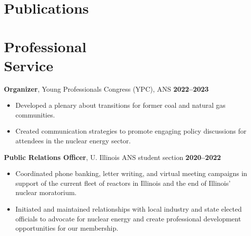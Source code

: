 \documentclass[margin,line]{resume}
\begin{document}
\begin{resume}
    \section{\mysidestyle Publications}

    \begin{bibenum}
        \item {}
        \item {}
        \item {}
        \item {}
    \end{bibenum}

    \section{\mysidestyle Professional\\Service}

    \textbf{Organizer}, Young Professionals Congress (YPC), ANS \hfill \textbf{2022--2023}\vspace{.5mm}\\%
    \begin{itemize}
        \item Developed a plenary about transitions for former coal and natural gas communities.
        \item Created communication strategies to promote engaging policy discussions for attendees in the nuclear energy sector.
    \end{itemize}

    \textbf{Public Relations Officer}, U. Illinois ANS student section  \hfill \textbf{2020--2022}\vspace{.5mm}\\%
    \begin{itemize}
        \item Coordinated phone banking, letter writing, and virtual meeting campaigns in support of the current fleet of reactors in Illinois and the end of Illinois' nuclear moratorium.
        \item Initiated and maintained relationships with local industry and state elected officials to advocate for nuclear energy and create professional development opportunities for our membership.
    \end{itemize}

\end{resume}
\end{document}
